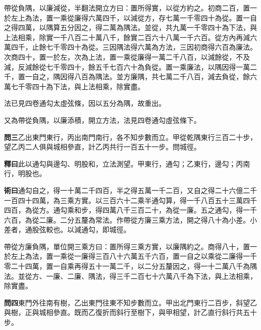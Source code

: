 \documentclass[12pt,a4paper]{article}
\begin{document}
\vspace{0.3em}

帶從負隅，以廉減從，半翻法開立方曰：置所得實，以從方約之。初商二百，置一於左上為法，置一乘從廉得六萬四千，以減從方，存七萬一千零四十為從。置一自之得四萬，以隅算五分因之，得二萬為隅法。並從，共九萬一千零四十為下法，與上法相乘，除實一千八百二十萬八千，餘實二百六十八萬一千六百。從方內再減六萬四千，止餘七千零四十為從。三因隅法得六萬為方法，三因初商得六百為廉法。次商四十，置一於左，次為上法，置一乘從廉得一萬二千八百，以減餘從，不及減，反減餘從七千零四十，餘五千七百六十為負從。置一乘廉法，以隅因得一萬二千，置一自之，隅因得八百為隅法。並方廉隅，共七萬二千八百，減去負從，餘六萬七千零四十為下法，與上法相乘，除實盡。

\vspace{0.3em}

法已見四卷通勾太虛弦條，因以五分為隅，故重出。

又為帶從負隅，以廉添積，開立方法，法見四卷通勾虛弦條下。

\vspace{0.5em}

\noindent\textbf{問三}\quad 乙出東門東行，丙出南門南行，各不知步數而立。甲從乾隅東行三百二十步，望乙丙二人俱與城相參直，計乙丙共行一百五十一步。問城徑。

\vspace{0.3em}

\noindent\textbf{釋曰}\quad 此以通勾與邊勾、明股和，立法測望。甲東行，通勾；乙東行，邊勾；丙南行，明股也。

\vspace{0.3em}

\noindent\textbf{術曰}\quad 通勾自之，得一十萬二千四百，半之得五萬一千二百，又自之得二十六億二千一百四十四萬，為三乘方實。以三百六十二乘半通勾算，得一千八百五十三萬四千四百，為從方。通勾乘和步，得四萬八千三百二十，為從一廉。五之通勾，得一千六百，為從二廉。二分五釐為常法。作帶從方廉三乘方法，開之得八十為小差。小差者，通股弦較也。以減通勾，即城徑。

\vspace{0.3em}

帶從方廉負隅，單位開三乘方曰：置所得三乘方實，以廉隅約之。商得八十，置一於左上為法，置一乘從一廉得三百八十六萬五千六百，置一自之以乘從二廉得一千零二十四萬，置一自乘再得五十一萬二千，以二分五釐因之，得一十二萬八千為隅法。並從方、一廉、二廉、隅法，得三千二百七十六萬八千為下法，與上法相乘，除實盡。

\vspace{0.5em}

\noindent\textbf{問四}\quad 東門外往南有樹，乙出東門往東不知步數而立。甲出北門東行二百步，斜望乙與樹，正與城相參直。既而乙復折而斜行至樹下，與甲相望，計乙直行斜行共五十步。
\end{document}
